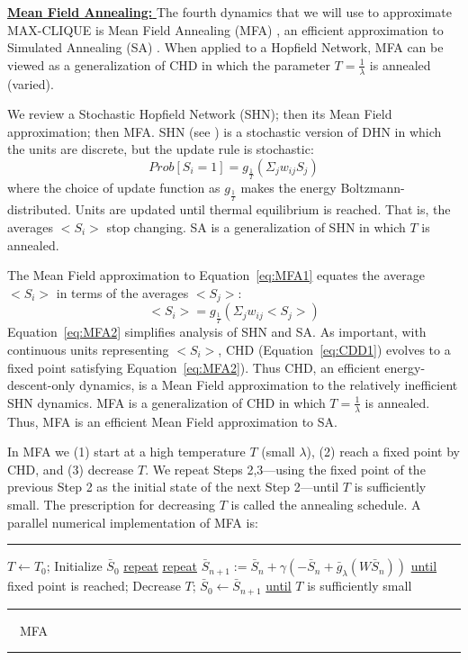 {\underline{\bf Mean Field Annealing: }}
\label{MFA}
The fourth dynamics that we will use to approximate MAX-CLIQUE is
Mean Field Annealing (MFA) \cite{kn:BMM89,kn:PeS89}, an efficient approximation to 
Simulated Annealing (SA) \cite{kn:KGV83}. When applied to a Hopfield Network,
MFA can be viewed as a generalization of CHD in which
the parameter $T = \frac{1}{\lambda}$ is annealed (varied). \par
We review a Stochastic Hopfield Network (SHN); then its Mean
Field approximation; then MFA.
SHN (see \cite{kn:HKP91}) is a stochastic
version of DHN in which the units are discrete,
but the update rule is stochastic:
\begin{equation}
Prob[S_i = 1] = 
g_{\frac{1}{T}}(\Sigma_{j} w_{ij} S_j) 
\label{eq:MFA1}
\end{equation}
where the choice of update function as $g_{\frac{1}{T}}$ makes the energy Boltzmann-distributed.
Units are updated until thermal equilibrium is reached. That is,
the averages $<S_i>$ stop changing. 
SA is a generalization
of SHN in which $T$ is annealed. \par
The Mean Field approximation to Equation~\ref{eq:MFA1}
equates the average $<S_i>$ in terms of the averages 
$<S_j>$:
\begin{equation}
<S_i> = g_{\frac{1}{T}}(\Sigma_{j} w_{ij} <S_j>) 
\label{eq:MFA2}
\end{equation}
Equation~\ref{eq:MFA2} simplifies analysis of 
SHN and SA. 
As important, with continuous units representing $<S_i>$,
CHD (Equation~\ref{eq:CDD1})
evolves to a fixed point satisfying
Equation~\ref{eq:MFA2}). 
Thus CHD, an efficient energy-descent-only dynamics, is a Mean Field 
approximation to the relatively inefficient SHN dynamics. 
MFA is a generalization of CHD in which
$T = \frac{1}{\lambda}$ is annealed. Thus, MFA is an
efficient Mean Field approximation to 
SA. 
\par
In MFA we (1) start
at a high temperature $T$ (small $\lambda$), (2) reach a fixed
point by CHD, and (3) decrease $T$. We repeat Steps 2,3---using
the fixed point of the previous Step 2 as the initial state of
the next Step 2---until $T$ is sufficiently small.
The prescription for decreasing $T$ is called the
annealing schedule. A parallel numerical implementation of MFA 
is: \newline
\rule{6.8in}{0.01in}
\newline
$T \leftarrow  T_0 $;  Initialize $\bar{S}_0$ \newline
\underline{repeat} \underline{repeat} 
$\bar{S}_{n+1} := \bar{S}_n + \gamma (-\bar{S}_n + \bar{g}_{\lambda}(W \bar{S}_n))$  
\underline{until} fixed point is reached; 
\hspace*{0.3in} Decrease $T$; 
$\bar{S}_0 \leftarrow \bar{S}_{n+1}$ \newline
\underline{until} $T$ is sufficiently small \newline
\rule{3.1in}{0.01in}
~~MFA~~
\rule{3.1in}{0.01in}

